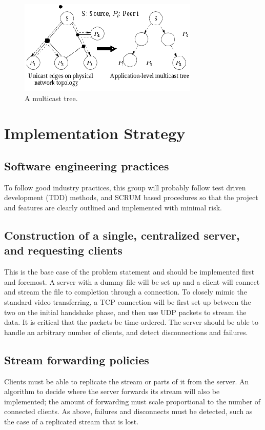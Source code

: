 \documentclass[fleqn,24pt]{SelfArx} %
\begin{document}
\begin{figure}[!htb]
\includegraphics{Selection_148.png}
\caption{\label{family}A multicast tree. \cite{1}}
\label{1}
\end{figure}

\section{Implementation Strategy}

\subsection{Software engineering practices}
To follow good industry practices, this group will probably follow test driven development (TDD) methods, and SCRUM based procedures so that the project and features are clearly outlined and implemented with minimal risk. 

\subsection{Construction of a single, centralized server, and requesting clients}
This is the base case of the problem statement and should be implemented first and foremost. A server with a dummy file will be set up and a client will connect and stream the file to completion through a connection. To closely mimic the standard video transferring, a TCP connection will be first set up between the two on the initial handshake phase, and then use UDP packets to stream the data. It is critical that the packets be time-ordered. The server should be able to handle an arbitrary number of clients, and detect disconnections and failures. 

\subsection{Stream forwarding policies}
Clients must be able to replicate the stream or parts of it from the server. An algorithm to decide where the server forwards its stream will also be implemented; the amount of forwarding must scale proportional to the number of connected clients. As above, failures and disconnects must be detected, such as the case of a replicated stream that is lost. 
\end{document}
